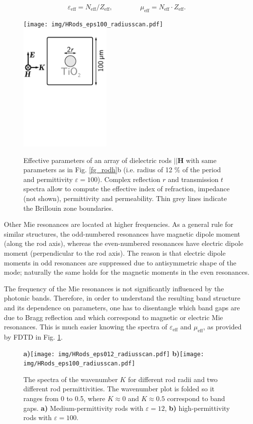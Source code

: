 \documentclass[letterpaper,12pt]{report}
\begin{document}
\begin{equation} \varepsilon_{\text{eff}} = N_{\text{eff}}/Z_{\text{eff}}, \quad\quad\quad\quad \mu_{\text{eff}} = N_{\text{eff}}\cdot Z_{\text{eff}}.
\label{eq_epsmu}\end{equation}

\begin{figure}[ht]  \caption{Effective parameters of an array of dielectric rods $||\mathbf H$ with same parameters as in Fig. \ref{fg_rodh}b (i.e. radius of  12 \% of the period and permittivity $\varepsilon = 100$). Complex reflection $r$ and transmission $t$ spectra allow to compute the effective index of refraction, impedance (not shown), permittivity and permeability. Thin grey lines indicate the Brillouin zone boundaries.}
\label{fg_rodh_fdtd} \centering 
\texttt{[image: img/HRods\_eps100\_radiusscan.pdf]}
\includegraphics[width=4.5cm]{img/HRods_sketch.pdf}
\end{figure}

Other Mie resonances are located at higher frequencies. As a general rule for similar structures, the odd-numbered resonances have magnetic dipole moment (along the rod axis), whereas the even-numbered resonances have electric dipole moment (perpendicular to the rod axis). The reason is that electric dipole moments in odd resonances are suppressed due to antisymmetric shape of the mode; naturally the same holds for the magnetic moments in the even resonances.

The frequency of the Mie resonances is not significantly influenced by the photonic bands. Therefore, in order to understand the resulting band structure and its dependence on parameters, one has to disentangle which band gaps are due to Bragg reflection and which correspond to magnetic or electric Mie resonances. This is much easier knowing the spectra of $\varepsilon_{\text{eff}}$ and $\mu_{\text{eff}}$, as provided by FDTD in Fig. \ref{fg_rodh_fdtd}.
\begin{figure}[ht] \caption{The spectra of the wavenumber $K$ for different rod radii and two different rod permittivities. The wavenumber plot is folded so it ranges from 0 to 0.5, where $K\approx 0$ and $K\approx 0.5$ correspond to band gaps. \textbf{a)} Medium-permittivity rods with $\varepsilon = 12$, \textbf{b)} high-permittivity rods with $\varepsilon = 100$.  } \label{fg_hbar_radiusscan} \centering 
\textbf{a)}\texttt{[image: img/HRods\_eps012\_radiusscan.pdf]}
\textbf{b)}\texttt{[image: img/HRods\_eps100\_radiusscan.pdf]}
\end{figure}
\end{document}
